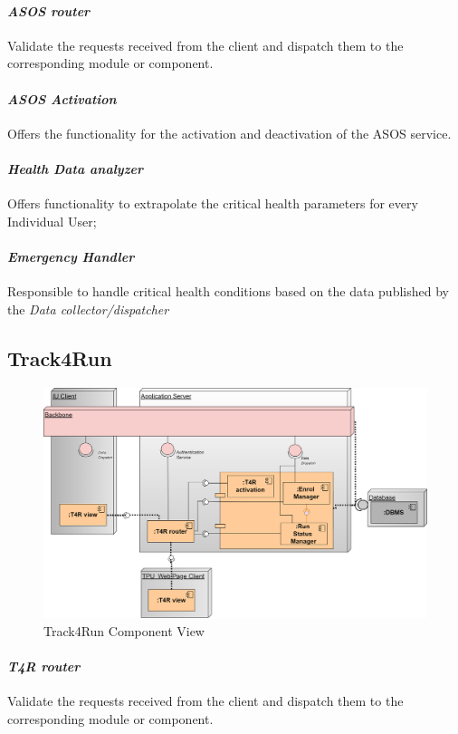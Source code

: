 \paragraph{\textit{ASOS router}} Validate the requests received from the client and dispatch them to the corresponding module or component.
\paragraph{\textit{ASOS Activation}} Offers the functionality for the activation and deactivation of the ASOS service.
\paragraph{\textit{Health Data analyzer}} Offers functionality to extrapolate the critical health parameters for every Individual User;
\paragraph{\textit{Emergency Handler}} Responsible to handle critical health conditions based on the data published by the \textit{Data collector/dispatcher}
\clearpage
\subsection{Track4Run}
\label{subsect:T4RComponentView}
\begin{figure}[H]
\caption{Track4Run Component View}
\centering
\includegraphics[width = \textwidth]{sections/architecturalDesign/T4RDiagram.png}
\end{figure}
\paragraph{\textit{T4R router}} Validate the requests received from the client and dispatch them to the corresponding module or component.
